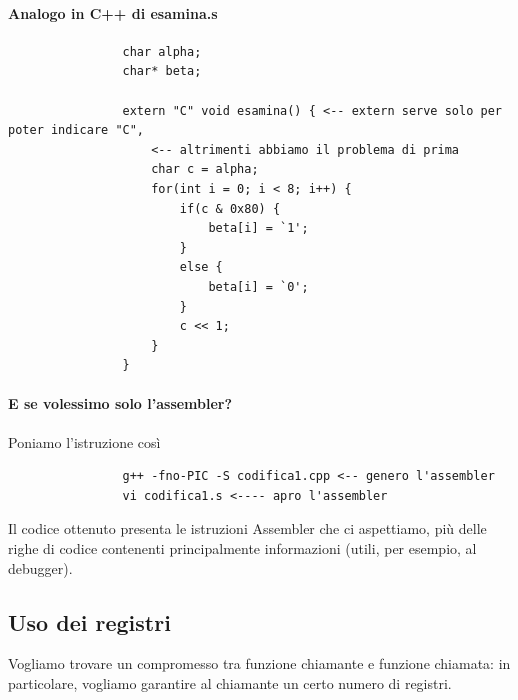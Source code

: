 			\paragraph{Analogo in C++ di esamina.s}
			\begin{verbatim}
				char alpha;
				char* beta;
				
				extern "C" void esamina() { <-- extern serve solo per poter indicare "C", 
					<-- altrimenti abbiamo il problema di prima
					char c = alpha;
					for(int i = 0; i < 8; i++) {
						if(c & 0x80) {
							beta[i] = `1';
						}
						else {
							beta[i] = `0';
						}
						c << 1;
					}
				}
			\end{verbatim}
			
			\paragraph{E se volessimo solo l'assembler?} Poniamo l'istruzione così
			\begin{verbatim}
				g++ -fno-PIC -S codifica1.cpp <-- genero l'assembler
				vi codifica1.s <---- apro l'assembler
			\end{verbatim}
			Il codice ottenuto presenta le istruzioni Assembler che ci aspettiamo, più delle righe di codice contenenti principalmente informazioni (utili, per esempio, al debugger).
			
			\clearpage \subsection{Uso dei registri} 
			Vogliamo trovare un compromesso tra funzione chiamante e funzione chiamata: in particolare, vogliamo garantire al chiamante un certo numero di registri.
			
